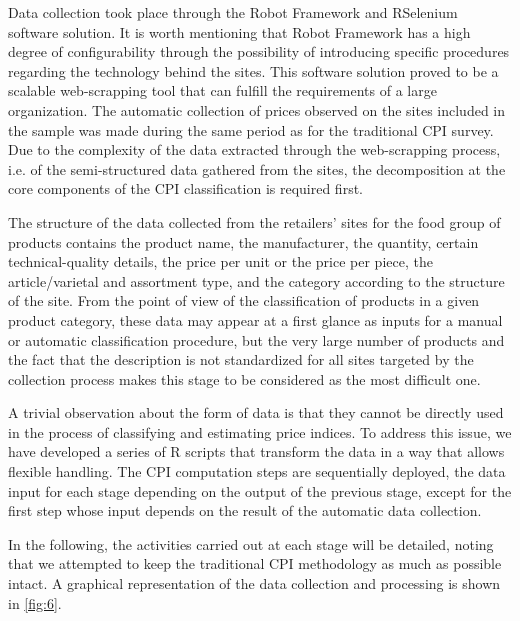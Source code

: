 \documentclass[]{article}
\begin{document}
Data collection took place through the Robot Framework and RSelenium software solution. It is worth mentioning that Robot Framework
has a high degree of configurability through the possibility of introducing specific procedures regarding the technology
behind the sites. This software solution proved to be a scalable web-scrapping tool that can fulfill the requirements of a 
large organization. The automatic collection of prices observed on the sites included in the sample was made during
the same period as for the traditional CPI survey. Due to the complexity of the data extracted through the 
web-scrapping process, i.e. of the semi-structured data gathered from the sites, the decomposition at the 
core components of the CPI classification is required first.


The structure of the data collected from the retailers’ sites for the food group of products contains the product 
name, the manufacturer, the quantity, certain technical-quality details, the price per unit or the price per piece, 
the article/varietal and assortment type, and the category according to the structure of the site. From the point of view 
of the classification of products in a given product category, these data may appear at a first glance 
as inputs for a manual or automatic classification procedure, but the very large number of products and the fact 
that the description is not standardized for all sites targeted by the collection process makes this stage to be considered as the most difficult one.

A trivial observation about the form of data is that they cannot be directly used in the process of classifying 
and estimating price indices. To address this issue, we have developed a series of R scripts that transform 
the data in a way that allows flexible handling. The CPI computation steps are sequentially deployed, the data 
input for each stage depending on the output of the previous stage, except for the first step whose input depends 
on the result of the automatic data collection.



In the following, the activities carried out at each stage will be detailed, noting that we attempted to keep the 
traditional CPI methodology as much as possible intact. A graphical representation of the data collection and processing is shown in \ref{fig:6}.
\end{document}

